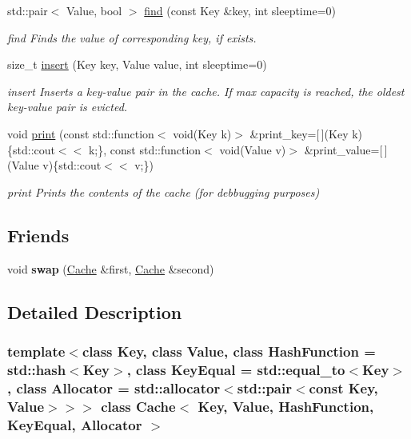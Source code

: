 \begin{DoxyCompactItemize}
std\+::pair$<$ Value, bool $>$ \mbox{\hyperlink{class_cache_a69e99d60b40223afce1b5c1a89a71e05}{find}} (const Key \&key, int sleeptime=0)
\begin{DoxyCompactList}\small\item\em find Finds the value of corresponding key, if exists. \end{DoxyCompactList}\item 
size\+\_\+t \mbox{\hyperlink{class_cache_a8e44a1490dac6dfdaa5dd75dc558b1c2}{insert}} (Key key, Value value, int sleeptime=0)
\begin{DoxyCompactList}\small\item\em insert Inserts a key-\/value pair in the cache. If max capacity is reached, the oldest key-\/value pair is evicted. \end{DoxyCompactList}\item 
\mbox{\label{class_cache_ae0de6a8741d800b5843581c0d21a09d6}} 
void \mbox{\hyperlink{class_cache_ae0de6a8741d800b5843581c0d21a09d6}{print}} (const std\+::function$<$ void(Key k)$>$ \&print\+\_\+key=\mbox{[}$\,$\mbox{]}(Key k)\{std\+::cout$<$$<$ k;\}, const std\+::function$<$ void(Value v)$>$ \&print\+\_\+value=\mbox{[}$\,$\mbox{]}(Value v)\{std\+::cout$<$$<$ v;\})
\begin{DoxyCompactList}\small\item\em print Prints the contents of the cache (for debbugging purposes) \end{DoxyCompactList}\end{DoxyCompactItemize}
\subsection*{Friends}
\begin{DoxyCompactItemize}
\item 
\mbox{\label{class_cache_af1108b256b507b7d279ba2859354b556}} 
void {\bfseries swap} (\mbox{\hyperlink{class_cache}{Cache}} \&first, \mbox{\hyperlink{class_cache}{Cache}} \&second)
\end{DoxyCompactItemize}


\subsection{Detailed Description}
\subsubsection*{template$<$class Key, class Value, class Hash\+Function = std\+::hash$<$\+Key$>$, class Key\+Equal = std\+::equal\+\_\+to$<$\+Key$>$, class Allocator = std\+::allocator$<$std\+::pair$<$const Key, Value$>$$>$$>$\newline
class Cache$<$ Key, Value, Hash\+Function, Key\+Equal, Allocator $>$}

